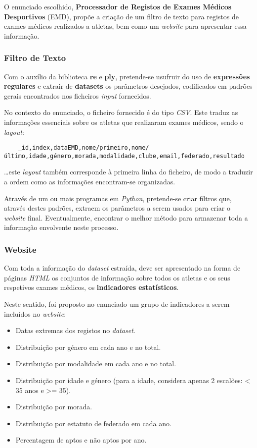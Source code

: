 O enunciado escolhido, \textbf{Processador de Registos de Exames Médicos Desportivos} (EMD), propõe a criação de um 
filtro de texto para registos de exames médicos realizados a atletas, bem como um \textit{website} para apresentar 
essa informação.

\subsubsection{Filtro de Texto}

Com o auxílio da biblioteca \textbf{re} e \textbf{ply}, pretende-se usufruir do uso de \textbf{expressões regulares} e extrair de \textbf{datasets}
os parâmetros desejados, codificados em padrões gerais encontrados nos ficheiros \textit{input} fornecidos.

No contexto do enunciado, o ficheiro fornecido é do tipo \textit{CSV}.
Este traduz as informações essenciais sobre os atletas que realizaram exames médicos, sendo o \textit{layout}:

\begin{verbatim}
    _id,index,dataEMD,nome/primeiro,nome/último,idade,género,morada,modalidade,clube,email,federado,resultado
\end{verbatim}

\dots este \textit{layout} também corresponde à primeira linha do ficheiro, de modo a traduzir a ordem como as informações 
encontram-se organizadas.

Através de um ou mais programas em \textit{Python}, pretende-se criar filtros que, através destes padrões, extraem os 
parâmetros a serem usados para criar o \textit{website} final.
Eventualmente, encontrar o melhor método para armazenar toda a informação envolvente neste processo.

\subsubsection{Website}

Com toda a informação do \textit{dataset} estraída, deve ser apresentado na forma de páginas \textit{HTML} os conjuntos de 
informação sobre todos os atletas e os seus respetivos exames médicos, os \textbf{indicadores estatísticos}. 

Neste sentido, foi proposto no enunciado um grupo de indicadores a serem incluídos no \textit{website}:
\begin{itemize}
    \item Datas extremas dos registos no \textit{dataset}.
    \item Distribuição por género em cada ano e no total.
    \item Distribuição por modalidade em cada ano e no total.
    \item Distribuição por idade e género (para a idade, considera apenas 2 escalões: < 35 anos e >= 35).
    \item Distribuição por morada.
    \item Distribuição por estatuto de federado em cada ano.
    \item Percentagem de aptos e não aptos por ano.
\end{itemize}


